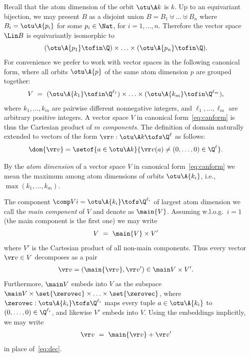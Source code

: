 Recall that the atom dimension of the orbit $\otu \A k$ is $k$.
Up to an equivariant bijection, we may present $B$ as a disjoint union 
$B = B_1 \uplus \ldots \uplus B_n$ where $B_i = \otu \A {p_i}$ for some $p_i\in\Nat$, for $i = 1,\ldots, n$.
Therefore the vector space $\Lin B$ is equivariantly isomorphic to
\[
(\otu \A {p_1} \tofin \Q) \times \ldots \times (\otu \A {p_n} \tofin \Q).
\]
For convenience we prefer to work with vector spaces in the following canonical form, where 
all orbits $\otu \A {p}$ of the same atom dimension $p$ are grouped together:
\begin{align} \label{eq:canform}
V \ = \ (\otu \A {k_1} \tofin \Q^{\ell_1}) \times
\ldots \times
(\otu \A {k_m} \tofin \Q^{\ell_m}),
\end{align}
where $k_1, \ldots, k_m$ are pairwise different nonnegative integers, and $\ell_1, \ldots, \ell_m$ are arbitrary positive integers.
A vector space $V$ in canonical form~\eqref{eq:canform} is thus the Cartesian product of $m$ \emph{components}.
The definition of  domain naturally extended to vectors of the form $\vr v : \otu \A k \tofs \Q^\ell$ as follows:
\[
\dom{\vr v} = \setof{a\in\otu \A k}{\vr v(a) \neq (0, \ldots, 0) \in \Q^\ell}.
\]
\begin{definition} \label{def:ad}
By the \emph{atom dimension} of a vector space $V$ in canonical form~\eqref{eq:canform} 
we mean the maximum among atom dimensions 
of orbits $\otu \A {k_i}$, i.e., $\max(k_1, \ldots, k_m)$.
\end{definition}
The component ${\comp V i = \otu \A {k_i} \tofs \Q^{\ell_i}}$ of largest atom dimension 
we call the \emph{main component} of $V$ and denote as $\main{V}$.
Assuming w.l.o.g.~$i = 1$ (the main component is the first one) we may write
\[
V \ = \ \main{V} \times V'
\]
where $V'$ is the Cartesian product of all non-main components.
Thus every vector $\vr v \in V$ decomposes as a pair 
\begin{align}\label{eq:dec}
\vr v = (\main{\vr v}, \vr v') \in \main V\times V'.
\end{align}
Furthermore,
$\main V$ embeds into $V$ as the subspace 
$\main V \times \set{\zerovec}\times \ldots \times \set{\zerovec}$, where $\zerovec : \otu \A {k_i} \tofs \Q^{\ell_i}$ maps
every tuple $a\in\otu \A {k_i}$ to $(0, \ldots, 0) \in \Q^{\ell_i}$,
and likewise $V'$ embeds into $V$.
Using the embeddings implicitly, we may write
\begin{align} \label{eq:plus}
\vr v \ = \ \main{\vr v} + \vr v'
\end{align}
in place of~\eqref{eq:dec}.


